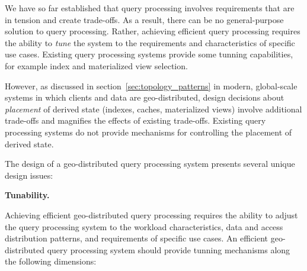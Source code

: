 
We have so far established that query processing involves requirements that are in tension and create trade-offs.
As a result, there can be no general-purpose solution to query processing.
Rather, achieving efficient query processing requires the ability to \textit{tune} the system to the requirements
and characteristics of specific use cases.
Existing query processing systems provide some tunning capabilities, for example index and materialized view selection.

However, as discussed in section~\ref{sec:topology_patterns} in modern, global-scale systems in which clients and data
are geo-distributed,
design decisions about \textit{placement} of derived state (indexes, caches, materialized views) involve additional
trade-offs and magnifies the effects of existing trade-offs.
Existing query processing systems do not provide mechanisms for controlling the placement of derived state.

\medskip
\noindent
The design of a geo-distributed query processing system presents several unique design issues:

\smallskip
\noindent
\textbf{Tunability.}

\noindent
Achieving efficient geo-distributed query processing requires the ability to adjust the query processing system
to the workload characteristics, data and access distribution patterns, and requirements of specific use cases.
An efficient geo-distributed query processing system should provide tunning mechanisms along the following dimensions:

